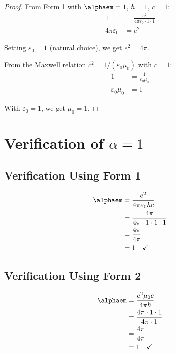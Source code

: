 	\begin{proof}
		From Form 1 with $\alphaem = 1$, $\hbar = 1$, $c = 1$:
		\begin{align}
			1 &= \frac{e^2}{4\pi\varepsilon_0 \cdot 1 \cdot 1}\\
			4\pi\varepsilon_0 &= e^2
		\end{align}
		
		Setting $\varepsilon_0 = 1$ (natural choice), we get $e^2 = 4\pi$.
		
		From the Maxwell relation $c^2 = 1/(\varepsilon_0\mu_0)$ with $c = 1$:
		\begin{align}
			1 &= \frac{1}{\varepsilon_0\mu_0}\\
			\varepsilon_0\mu_0 &= 1
		\end{align}
		
		With $\varepsilon_0 = 1$, we get $\mu_0 = 1$.
	\end{proof}
	
	\section{Verification of $\alpha = 1$}
	
	\subsection{Verification Using Form 1}
	
	\begin{proof_step}
		\begin{align}
			\alphaem &= \frac{e^2}{4\pi\varepsilon_0\hbar c}\\
			&= \frac{4\pi}{4\pi \cdot 1 \cdot 1 \cdot 1}\\
			&= \frac{4\pi}{4\pi}\\
			&= 1 \quad \checkmark
		\end{align}
	\end{proof_step}
	
	\subsection{Verification Using Form 2}
	
	\begin{proof_step}
		\begin{align}
			\alphaem &= \frac{e^2 \mu_0 c}{4\pi \hbar}\\
			&= \frac{4\pi \cdot 1 \cdot 1}{4\pi \cdot 1}\\
			&= \frac{4\pi}{4\pi}\\
			&= 1 \quad \checkmark
		\end{align}
	\end{proof_step}
	
